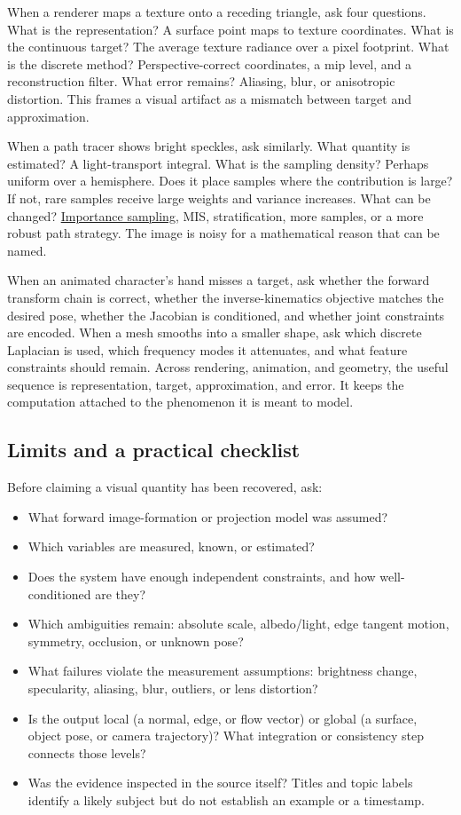 When a renderer maps a texture onto a receding triangle, ask four questions. What is the representation? A surface point maps to texture coordinates. What is the continuous target? The average texture radiance over a pixel footprint. What is the discrete method? Perspective-correct coordinates, a mip level, and a reconstruction filter. What error remains? Aliasing, blur, or anisotropic distortion. This frames a visual artifact as a mismatch between target and approximation.

When a path tracer shows bright speckles, ask similarly. What quantity is estimated? A light-transport integral. What is the sampling density? Perhaps uniform over a hemisphere. Does it place samples where the contribution is large? If not, rare samples receive large weights and variance increases. What can be changed? \hyperref[appendix-031e02bf28af]{Importance sampling}, MIS, stratification, more samples, or a more robust path strategy. The image is noisy for a mathematical reason that can be named.

When an animated character's hand misses a target, ask whether the forward transform chain is correct, whether the inverse-kinematics objective matches the desired pose, whether the Jacobian is conditioned, and whether joint constraints are encoded. When a mesh smooths into a smaller shape, ask which discrete Laplacian is used, which frequency modes it attenuates, and what feature constraints should remain. Across rendering, animation, and geometry, the useful sequence is representation, target, approximation, and error. It keeps the computation attached to the phenomenon it is meant to model.

\subsection{Limits and a practical checklist}\label{04-visual-computing-ii-ch034-limits-and-a-practical-checklist}

Before claiming a visual quantity has been recovered, ask:

\begin{itemize}
\tightlist
\item
  What forward image-formation or projection model was assumed?
\item
  Which variables are measured, known, or estimated?
\item
  Does the system have enough independent constraints, and how well-conditioned are they?
\item
  Which ambiguities remain: absolute scale, albedo/light, edge tangent motion, symmetry, occlusion, or unknown pose?
\item
  What failures violate the measurement assumptions: brightness change, specularity, aliasing, blur, outliers, or lens distortion?
\item
  Is the output local (a normal, edge, or flow vector) or global (a surface, object pose, or camera trajectory)? What integration or consistency step connects those levels?
\item
  Was the evidence inspected in the source itself? Titles and topic labels identify a likely subject but do not establish an example or a timestamp.
\end{itemize}

